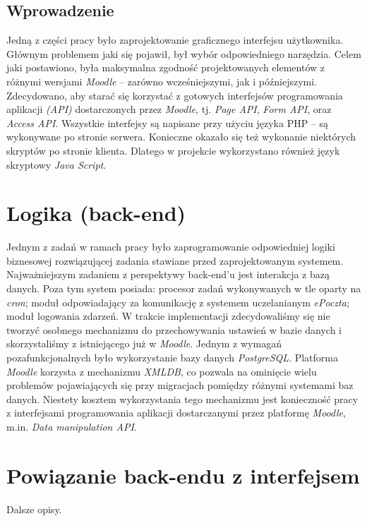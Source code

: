 \subsection{Wprowadzenie}
Jedną z części pracy było zaprojektowanie graficznego interfejsu użytkownika. Głównym problemem jaki się pojawił, był wybór odpowiedniego narzędzia. Celem jaki postawiono, była maksymalna zgodność projektowanych elementów z różnymi wersjami \emph{Moodle} -- zarówno wcześniejszymi, jak i późniejszymi. Zdecydowano, aby starać się korzystać z gotowych interfejsów programowania aplikacji \emph{(API)} dostarczonych przez \emph{Moodle}, tj. \emph{Page API}, \emph{Form API}, oraz \emph{Access API}. Wszystkie interfejsy są napisane przy użyciu języka PHP -- są wykonywane po stronie serwera. Konieczne okazało się też wykonanie niektórych skryptów po stronie klienta. Dlatego w projekcie wykorzystano również język skryptowy \emph{Java Script}.

\section{Logika (back-end)}
\label{Chapter65}

Jednym z zadań w ramach pracy było zaprogramowanie odpowiedniej logiki biznesowej rozwiązującej zadania stawiane przed zaprojektowanym systemem. Najważniejszym zadaniem z perspektywy back-end'u jest interakcja z bazą danych. Poza tym system posiada: procesor zadań wykonywanych w tle oparty na \emph{cron}; moduł odpowiadający za komunikację z systemem uczelanianym \emph{ePoczta}; moduł logowania zdarzeń. W trakcie implementacji zdecydowaliśmy się nie tworzyć osobnego mechanizmu do przechowywania ustawień w bazie danych i skorzystaliśmy z istniejącego już w \emph{Moodle}. Jednym z wymagań pozafunkcjonalnych było wykorzystanie bazy danych \emph{PostgreSQL}. Platforma \emph{Moodle} korzysta z mechanizmu \emph{XMLDB}, co pozwala na ominięcie wielu problemów pojawiających się przy migracjach pomiędzy różnymi systemami baz danych. Niestety kosztem wykorzystania tego mechanizmu jest konieczność pracy z interfejsami programowania aplikacji dostarczanymi przez platformę \emph{Moodle}, m.in. \emph{Data manipulation API}.

\section{Powiązanie back-endu z interfejsem}
\label{Chapter66}

Dalsze opisy.